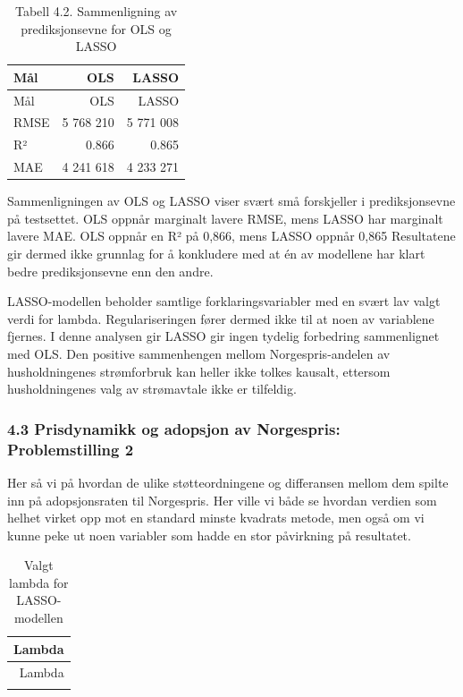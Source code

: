 \documentclass[
  letterpaper,
  DIV=11,
  numbers=noendperiod]{scrartcl}
\begin{document}
\begin{longtable}[]{@{}lrr@{}}
\caption{Tabell 4.2. Sammenligning av prediksjonsevne for OLS og
LASSO}\tabularnewline
\toprule\noalign{}
Mål & OLS & LASSO \\
\midrule\noalign{}
\endfirsthead
\toprule\noalign{}
Mål & OLS & LASSO \\
\midrule\noalign{}
\endhead
\bottomrule\noalign{}
\endlastfoot
RMSE & 5 768 210 & 5 771 008 \\
R² & 0.866 & 0.865 \\
MAE & 4 241 618 & 4 233 271 \\
\end{longtable}

Sammenligningen av OLS og LASSO viser svært små forskjeller i
prediksjonsevne på testsettet. OLS oppnår marginalt lavere RMSE, mens
LASSO har marginalt lavere MAE. OLS oppnår en R² på 0,866, mens LASSO
oppnår 0,865 Resultatene gir dermed ikke grunnlag for å konkludere med
at én av modellene har klart bedre prediksjonsevne enn den andre.

LASSO-modellen beholder samtlige forklaringsvariabler med en svært lav
valgt verdi for lambda. Regulariseringen fører dermed ikke til at noen
av variablene fjernes. I denne analysen gir LASSO gir ingen tydelig
forbedring sammenlignet med OLS. Den positive sammenhengen mellom
Norgespris-andelen av husholdningenes strømforbruk kan heller ikke
tolkes kausalt, ettersom husholdningenes valg av strømavtale ikke er
tilfeldig.

\subsubsection{4.3 Prisdynamikk og adopsjon av Norgespris:
Problemstilling
2}\label{prisdynamikk-og-adopsjon-av-norgespris-problemstilling-2-1}

Her så vi på hvordan de ulike støtteordningene og differansen mellom dem
spilte inn på adopsjonsraten til Norgespris. Her ville vi både se
hvordan verdien som helhet virket opp mot en standard minste kvadrats
metode, men også om vi kunne peke ut noen variabler som hadde en stor
påvirkning på resultatet.

\begin{longtable}[]{@{}r@{}}
\caption{Valgt lambda for LASSO-modellen}\tabularnewline
\toprule\noalign{}
Lambda \\
\midrule\noalign{}
\endfirsthead
\toprule\noalign{}
Lambda \\
\midrule\noalign{}
\endhead
\bottomrule\noalign{}
\endlastfoot
0.2947 \\
\end{longtable}
\end{document}
